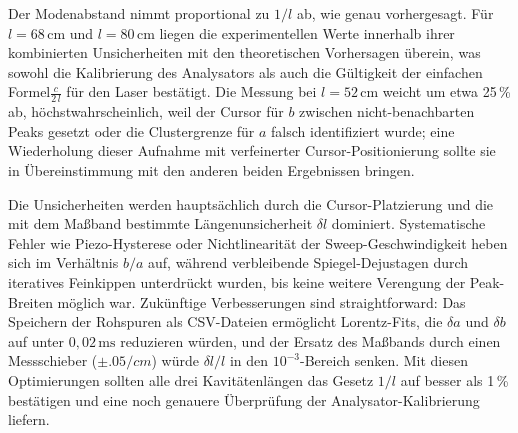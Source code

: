 \begin{table}[H]
  \centering
  \caption{Experimentelle und theoretische Modenabstände für drei interne Kavitätenlängen.}
  \label{tab:mode-spacings}
\end{table}

Der Modenabstand nimmt proportional zu $1/l$ ab, wie genau vorhergesagt. 
Für $l = 68\,\mathrm{cm}$ und $l = 80\,\mathrm{cm}$ liegen die experimentellen Werte innerhalb ihrer kombinierten Unsicherheiten mit den theoretischen Vorhersagen überein, was sowohl die Kalibrierung des Analysators als auch die Gültigkeit der einfachen Formel$ \frac{c}{2\,l}$ für den Laser bestätigt. 
Die Messung bei $l = 52\,\mathrm{cm}$ weicht um etwa 25\,\% ab, höchstwahrscheinlich, weil der Cursor für $b$ zwischen nicht-benachbarten Peaks gesetzt oder die Clustergrenze für $a$ falsch identifiziert wurde; eine Wiederholung dieser Aufnahme mit verfeinerter Cursor-Positionierung sollte sie in Übereinstimmung mit den anderen beiden Ergebnissen bringen.

Die Unsicherheiten werden hauptsächlich durch die Cursor-Platzierung und die mit dem Maßband bestimmte Längenunsicherheit $\delta l$ dominiert. Systematische Fehler wie Piezo-Hysterese oder Nichtlinearität der Sweep-Geschwindigkeit heben sich im Verhältnis $b/a$ auf, während verbleibende Spiegel-Dejustagen durch iteratives Feinkippen unterdrückt wurden, bis keine weitere Verengung der Peak-Breiten möglich war. Zukünftige Verbesserungen sind straightforward: Das Speichern der Rohspuren als CSV-Dateien ermöglicht Lorentz-Fits, die $\delta a$ und $\delta b$ auf unter $0{,}02\,\mathrm{ms}$ reduzieren würden, und der Ersatz des Maßbands durch einen Messschieber ($\pm .05 \si{/cm}$) würde $\delta l / l$ in den $10^{-3}$-Bereich senken. Mit diesen Optimierungen sollten alle drei Kavitätenlängen das Gesetz $1/l$ auf besser als 1\,\% bestätigen und eine noch genauere Überprüfung der Analysator-Kalibrierung liefern.



